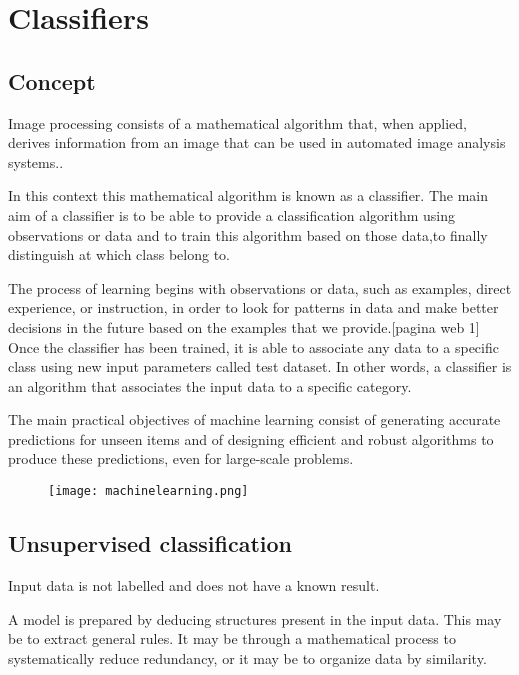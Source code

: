 \section{Classifiers}
     
     \subsection{Concept}
      
Image processing consists of a mathematical algorithm that, when applied, derives information from an image that can be used in automated image analysis systems.\cite{khouj2018hyperspectral}. 
 
 	In this context this mathematical algorithm is known as a classifier. The main aim of a classifier is to be able to provide a classification algorithm using observations or data and to train this algorithm based on those data,to finally distinguish at which class belong to.
 
	The process of learning begins with observations or data, such as examples, direct experience, or instruction, in order to look for patterns in data and make better decisions in the future based on the examples that we provide.[pagina web 1] Once the classifier has been trained, it is able to associate any data to a specific class using new input parameters called test dataset. In other words, a classifier is an algorithm that associates the input data to a specific category.
	
	
	The main practical objectives of machine learning consist of generating accurate predictions for unseen items and of designing efficient and robust algorithms to produce these predictions, even for large-scale problems.
	
	
	  \begin{figure}[H]
        \texttt{[image: machinelearning.png]}        
        \centering    
        \label{fig:systemArch}
    \end{figure}
    
     \subsection{Unsupervised classification}
            
   Input data is not labelled and does not have a known result.

	A model is prepared by deducing structures present in the input data. This may be to extract general rules. It may be through a mathematical process to systematically reduce redundancy, or it may be to organize data by similarity.

